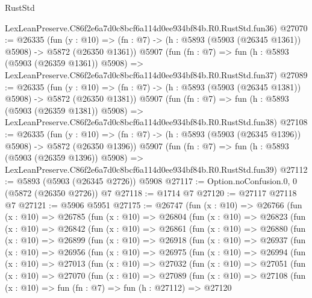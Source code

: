 \begin{lexlean}{RustStd}
\begin{coremodule}
    LexLeanPreserve.C86f2e6a7d0c8bcf6a114d0ee934bf84b.R0.RustStd.fun36)
@27070 := @26335
    (fun (y : @10) => (fn : @7) -> (h : @5893 (@5903 (@26345 @1361)) @5908) -> @5872 (@26350 @1361))
    @5907
    (fun (fn : @7) =>
    fun (h : @5893 (@5903 (@26359 @1361)) @5908) =>
    LexLeanPreserve.C86f2e6a7d0c8bcf6a114d0ee934bf84b.R0.RustStd.fun37)
@27089 := @26335
    (fun (y : @10) => (fn : @7) -> (h : @5893 (@5903 (@26345 @1381)) @5908) -> @5872 (@26350 @1381))
    @5907
    (fun (fn : @7) =>
    fun (h : @5893 (@5903 (@26359 @1381)) @5908) =>
    LexLeanPreserve.C86f2e6a7d0c8bcf6a114d0ee934bf84b.R0.RustStd.fun38)
@27108 := @26335
    (fun (y : @10) => (fn : @7) -> (h : @5893 (@5903 (@26345 @1396)) @5908) -> @5872 (@26350 @1396))
    @5907
    (fun (fn : @7) =>
    fun (h : @5893 (@5903 (@26359 @1396)) @5908) =>
    LexLeanPreserve.C86f2e6a7d0c8bcf6a114d0ee934bf84b.R0.RustStd.fun39)
@27112 := @5893 (@5903 (@26345 @2726)) @5908
@27117 := Option.noConfusion.{0, 0} (@5872 (@26350 @2726)) @7
@27118 := @1714 @7
@27120 := @27117 @27118 @7
@27121 := @5906 @5951
@27175 := @26747
    (fun (x : @10) =>
    @26766
      (fun (x : @10) =>
      @26785
        (fun (x : @10) =>
        @26804
          (fun (x : @10) =>
          @26823
            (fun (x : @10) =>
            @26842
              (fun (x : @10) =>
              @26861
                (fun (x : @10) =>
                @26880
                  (fun (x : @10) =>
                  @26899
                    (fun (x : @10) =>
                    @26918
                      (fun (x : @10) =>
                      @26937
                        (fun (x : @10) =>
                        @26956
                          (fun (x : @10) =>
                          @26975
                            (fun (x : @10) =>
                            @26994
                              (fun (x : @10) =>
                              @27013
                                (fun (x : @10) =>
                                @27032
                                  (fun (x : @10) =>
                                  @27051
                                    (fun (x : @10) =>
                                    @27070
                                      (fun (x : @10) =>
                                      @27089
                                        (fun (x : @10) =>
                                        @27108
                                          (fun (x : @10) =>
                                          fun (fn : @7) =>
                                          fun (h : @27112) =>
                                          @27120

\end{coremodule}
\end{lexlean}
